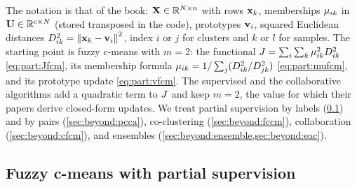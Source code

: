 The notation is that of the book: $\mathbf{X}\in\mathbb{R}^{N\times n}$ with rows $\mathbf{x}_k$, memberships $\mu_{ik}$ in $\mathbf{U}\in\mathbb{R}^{c\times N}$ (stored transposed in the code), prototypes $\mathbf{v}_i$, squared Euclidean distances $D^2_{ik}=\left\lVert \mathbf{x}_k-\mathbf{v}_i \right\rVert^2$, index $i$ or $j$ for clusters and $k$ or $l$ for samples. The starting point is fuzzy c-means with $m=2$: the functional $J=\sum_i\sum_k\mu_{ik}^2D^2_{ik}$ \eqref{eq:part:Jfcm}, its membership formula $\mu_{ik}=1/\sum_j(D^2_{ik}/D^2_{jk})$ \eqref{eq:part:mufcm}, and its prototype update \eqref{eq:part:vfcm}. The supervised and the collaborative algorithms add a quadratic term to $J$ and keep $m=2$, the value for which their papers derive closed-form updates. We treat partial supervision by labels (\cref{sec:beyond:ssfcm}) and by pairs (\cref{sec:beyond:pcca}), co-clustering (\cref{sec:beyond:fccm}), collaboration (\cref{sec:beyond:cfcm}), and ensembles (\cref{sec:beyond:ensemble,sec:beyond:eac}).

\subsection{Fuzzy c-means with partial supervision}\label{sec:beyond:ssfcm}


